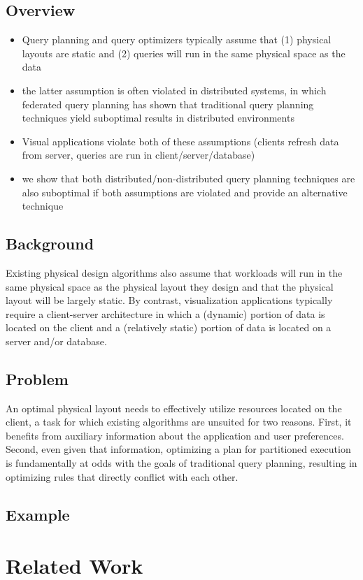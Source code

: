 \subsection{Overview}
\begin{itemize}
\item Query planning and query optimizers typically assume that (1) physical layouts are static and (2) queries will run in the same physical space as the data
\item the latter assumption is often violated in distributed systems, in which federated query planning has shown that traditional query planning techniques yield suboptimal results in distributed environments
\item Visual applications violate both of these assumptions (clients refresh data from server, queries are run in client/server/database) 
\item we show that both distributed/non-distributed query planning techniques are also suboptimal if both assumptions are violated and provide an alternative technique
\end{itemize}
\subsection{Background}
Existing physical design algorithms also assume that workloads will run in the same physical space as the physical layout they design and that the physical layout will be largely static. By contrast, visualization applications typically require a client-server architecture in which a (dynamic) portion of data is located on the client and a (relatively static) portion of data is located on a server and/or database. 

\subsection{Problem}
 An optimal physical layout needs to effectively utilize resources located on the client, a task for which existing algorithms are unsuited for two reasons. First, it benefits from auxiliary information about the application and user preferences. Second, even given that information, optimizing a plan for partitioned execution is fundamentally at odds with the goals of traditional query planning, resulting in optimizing rules that directly conflict with each other.

\subsection{Example}
\section{Related Work}